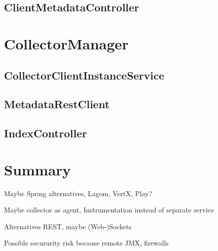 \subsection{ClientMetadataController}

\section{CollectorManager}

\subsection{CollectorClientInstanceService}

\subsection{MetadataRestClient}

\subsection{IndexController}

\section{Summary}

Maybe Spring alternatives, Lagom, VertX, Play?

Maybe collector as agent, Instrumentation instead of separate service

Alternatives REST, maybe (Web-)Sockets

Possible secururity risk because remote JMX, firewalls